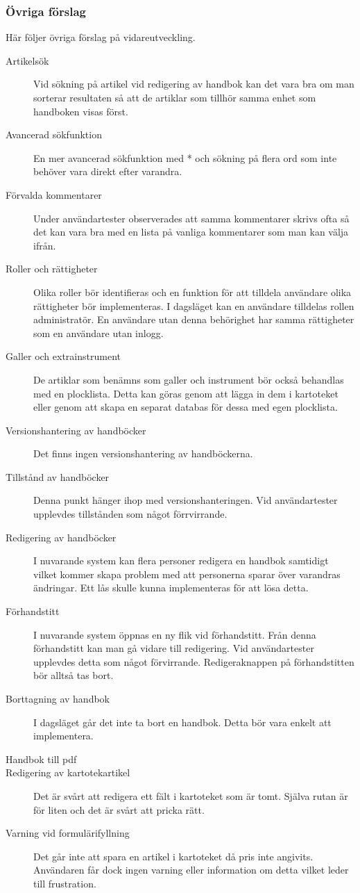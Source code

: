 \documentclass{article}
\begin{document}
\subsubsection{Övriga förslag}
Här följer övriga förslag på vidareutveckling.

\begin{description}
\item[Artikelsök] Vid sökning på artikel vid redigering av handbok kan det vara bra om man sorterar resultaten så att de artiklar som tillhör samma enhet som handboken visas först.
\item[Avancerad sökfunktion] En mer avancerad sökfunktion med * och sökning på flera ord som inte behöver vara direkt efter varandra.
\item[Förvalda kommentarer] Under användartester observerades att samma kommentarer skrivs ofta så det kan vara bra med en lista på vanliga kommentarer som man kan välja ifrån.
\item[Roller och rättigheter] Olika roller bör identifieras och en funktion för att tilldela användare olika rättigheter bör implementeras. I dagsläget kan en användare tilldelas rollen administratör. En användare utan denna behörighet har samma rättigheter som en användare utan inlogg.
\item[Galler och extrainstrument] De artiklar som benämns som galler och instrument bör också behandlas med en plocklista. Detta kan göras genom att lägga in dem i kartoteket eller genom att skapa en separat databas för dessa med egen plocklista.
\item[Versionshantering av handböcker] Det finns ingen versionshantering av handböckerna. %
\item[Tillstånd av handböcker] Denna punkt hänger ihop med versionshanteringen. Vid användartester upplevdes tillstånden som något förrvirrande.
\item[Redigering av handböcker] I nuvarande system kan flera personer redigera en handbok samtidigt vilket kommer skapa problem med att personerna sparar över varandras ändringar. Ett lås skulle kunna implementeras för att lösa detta.
\item[Förhandstitt] I nuvarande system öppnas en ny flik vid förhandstitt. Från denna förhandstitt kan man gå vidare till redigering. Vid användartester upplevdes detta som något förvirrande. Redigeraknappen på förhandstitten bör alltså tas bort.
\item[Borttagning av handbok] I dagsläget går det inte ta bort en handbok. Detta bör vara enkelt att implementera.
\item[Handbok till pdf] %
\item[Redigering av kartotekartikel] Det är svårt att redigera ett fält i kartoteket som är tomt. Själva rutan är för liten och det är svårt att pricka rätt.
\item[Varning vid formulärifyllning] Det går inte att spara en artikel i kartoteket då pris inte angivits. Användaren får dock ingen varning eller information om detta vilket leder till frustration.

\end{description}
\end{document}
